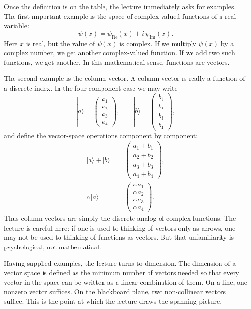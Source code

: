 Once the definition is on the table, the lecture immediately asks for examples. The first important example is the space of complex-valued functions of a real variable:
\begin{equation}
\psi(x) = \psi_{\mathrm{Re}}(x) + i\,\psi_{\mathrm{Im}}(x).
\end{equation}
Here \(x\) is real, but the value of \(\psi(x)\) is complex. If we multiply \(\psi(x)\) by a complex number, we get another complex-valued function. If we add two such functions, we get another. In this mathematical sense, functions are vectors.

The second example is the column vector. A column vector is really a function of a discrete index. In the four-component case we may write
\begin{equation}
|a\rangle
=
\left(
\begin{array}{c}
a_1\\
a_2\\
a_3\\
a_4
\end{array}
\right),
\qquad
|b\rangle
=
\left(
\begin{array}{c}
b_1\\
b_2\\
b_3\\
b_4
\end{array}
\right),
\end{equation}
and define the vector-space operations component by component:
\begin{align}
|a\rangle + |b\rangle
&=
\left(
\begin{array}{c}
a_1+b_1\\
a_2+b_2\\
a_3+b_3\\
a_4+b_4
\end{array}
\right),\\
\alpha |a\rangle
&=
\left(
\begin{array}{c}
\alpha a_1\\
\alpha a_2\\
\alpha a_3\\
\alpha a_4
\end{array}
\right).
\end{align}
Thus column vectors are simply the discrete analog of complex functions. The lecture is careful here: if one is used to thinking of vectors only as arrows, one may not be used to thinking of functions as vectors. But that unfamiliarity is psychological, not mathematical.

Having supplied examples, the lecture turns to dimension. The dimension of a vector space is defined as the minimum number of vectors needed so that every vector in the space can be written as a linear combination of them. On a line, one nonzero vector suffices. On the blackboard plane, two non-collinear vectors suffice. This is the point at which the lecture draws the spanning picture.

